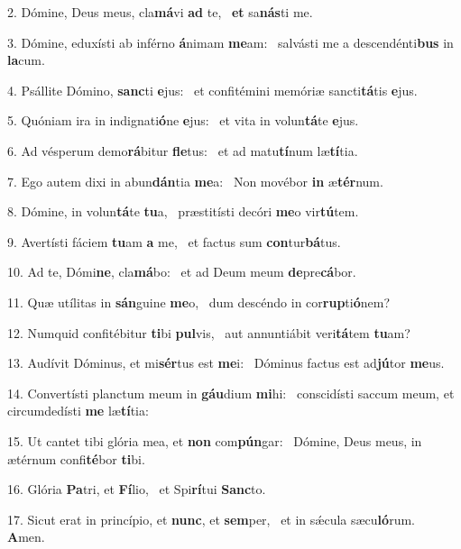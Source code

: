 2. Dómine, Deus meus, cla\textbf{má}vi \textbf{ad} te, \ast\  \textbf{et} sa\textbf{nás}ti me.\

3. Dómine, eduxísti ab inférno \textbf{á}nimam \textbf{me}am: \ast\  salvásti me a descendénti\textbf{bus} in \textbf{la}cum.\

4. Psállite Dómino, \textbf{sanc}ti \textbf{e}jus: \ast\  et confitémini memóriæ sancti\textbf{tá}tis \textbf{e}jus.\

5. Quóniam ira in indignati\textbf{ó}ne \textbf{e}jus: \ast\  et vita in volun\textbf{tá}te \textbf{e}jus.\

6. Ad vésperum demo\textbf{rá}bitur \textbf{fle}tus: \ast\  et ad matu\textbf{tí}num læ\textbf{tí}tia.\

7. Ego autem dixi in abun\textbf{dán}tia \textbf{me}a: \ast\  Non movébor \textbf{in} æ\textbf{tér}num.\

8. Dómine, in volun\textbf{tá}te \textbf{tu}a, \ast\  præstitísti decóri \textbf{me}o vir\textbf{tú}tem.\

9. Avertísti fáciem \textbf{tu}am \textbf{a} me, \ast\  et factus sum \textbf{con}tur\textbf{bá}tus.\

10. Ad te, Dómi\textbf{ne}, cla\textbf{má}bo: \ast\  et ad Deum meum \textbf{de}pre\textbf{cá}bor.\

11. Quæ utílitas in \textbf{sán}guine \textbf{me}o, \ast\  dum descéndo in cor\textbf{rup}ti\textbf{ó}nem?\

12. Numquid confitébitur \textbf{ti}bi \textbf{pul}vis, \ast\  aut annuntiábit veri\textbf{tá}tem \textbf{tu}am?\

13. Audívit Dóminus, et mi\textbf{sér}tus est \textbf{me}i: \ast\  Dóminus factus est ad\textbf{jú}tor \textbf{me}us.\

14. Convertísti planctum meum in \textbf{gáu}dium \textbf{mi}hi: \ast\  conscidísti saccum meum, et circumdedísti \textbf{me} læ\textbf{tí}tia:\

15. Ut cantet tibi glória mea, et \textbf{non} com\textbf{pún}gar: \ast\  Dómine, Deus meus, in ætérnum confi\textbf{té}bor \textbf{ti}bi.\

16. Glória \textbf{Pa}tri, et \textbf{Fí}lio, \ast\  et Spi\textbf{rí}tui \textbf{Sanc}to.\

17. Sicut erat in princípio, et \textbf{nunc}, et \textbf{sem}per, \ast\  et in sǽcula sæcu\textbf{ló}rum. \textbf{A}men.\

